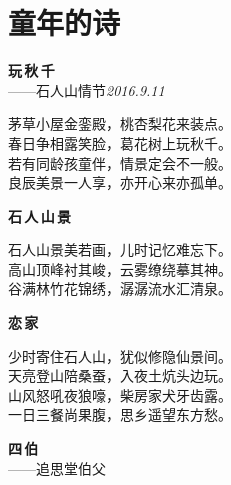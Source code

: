 \chapter{童年的诗}


\begin{center}
{\trueka\bfseries\large 玩\,秋\,千}\\[1pt]
{\trueka\small\color{inkgray} ——石人山情节\quad\textit{2016.9.11}}
\end{center}

\begin{center}\trueka
茅草小屋金銮殿，桃杏梨花来装点。\\
春日争相露笑脸，葛花树上玩秋千。\\
若有同龄孩童伴，情景定会不一般。\\
良辰美景一人享，亦开心来亦孤单。
\end{center}

\vspace{1.2em}

\begin{center}
{\trueka\bfseries\large 石\,人\,山\,景}
\end{center}

\begin{center}\trueka
石人山景美若画，儿时记忆难忘下。\\
高山顶峰衬其峻，云雾缭绕摹其神。\\
谷满林竹花锦绣，潺潺流水汇清泉。
\end{center}

\vspace{1.2em}

\begin{center}
{\trueka\bfseries\large 恋\,家}
\end{center}

\begin{center}\trueka
少时寄住石人山，犹似修隐仙景间。\\
天亮登山陪桑蚕，入夜土炕头边玩。\\
山风怒吼夜狼嚎，柴房家犬牙齿露。\\
一日三餐尚果腹，思乡遥望东方愁。
\end{center}

\vspace{1.2em}

\begin{center}
{\trueka\bfseries\large 四\,伯}\\[1pt]
{\trueka\small\color{inkgray} ——追思堂伯父}
\end{center}

